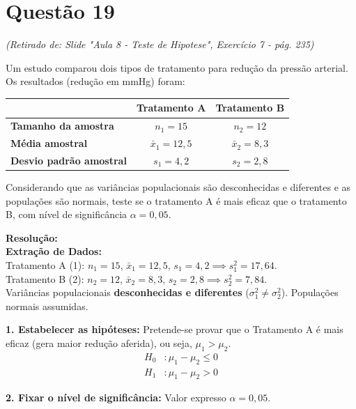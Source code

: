 \documentclass[12pt, a4paper]{article}
\begin{document}
\section*{Questão 19}
\textit{(Retirado de: Slide "Aula 8 - Teste de Hipotese", Exercício 7 - pág. 235)}

Um estudo comparou dois tipos de tratamento para redução da pressão arterial. Os resultados (redução em mmHg) foram:

\begin{table}[h]
\centering
\begin{tabular}{lcc}
\toprule
\textbf{} & \textbf{Tratamento A} & \textbf{Tratamento B} \\ \midrule
\textbf{Tamanho da amostra} & $n_1 = 15$ & $n_2 = 12$ \\
\textbf{Média amostral} & $\bar{x}_1 = 12{,}5$ & $\bar{x}_2 = 8{,}3$ \\
\textbf{Desvio padrão amostral} & $s_1 = 4{,}2$ & $s_2 = 2{,}8$ \\ \bottomrule
\end{tabular}
\end{table}

\medskip\noindent Considerando que as variâncias populacionais são desconhecidas e diferentes e as populações são normais, teste se o tratamento A é mais eficaz que o tratamento B, com nível de significância $\alpha = 0{,}05$.

\vspace{0.3cm}
\noindent\textbf{Resolução:}\\
\textbf{Extração de Dados:} \\
Tratamento A (1): $n_1 = 15$, $\bar{x}_1 = 12{,}5$, $s_1 = 4{,}2 \implies s^2_1 = 17{,}64$. \\
Tratamento B (2): $n_2 = 12$, $\bar{x}_2 = 8{,}3$, $s_2 = 2{,}8 \implies s^2_2 = 7{,}84$. \\
Variâncias populacionais \textbf{desconhecidas e diferentes} ($\sigma_1^2 \neq \sigma_2^2$). Populações normais assumidas.

\medskip\noindent \textbf{1. Estabelecer as hipóteses:}
Pretende-se provar que o Tratamento A é mais eficaz (gera maior redução aferida), ou seja, $\mu_1 > \mu_2$.
\begin{align*}
H_0 &: \mu_1 - \mu_2 \le 0 \\
H_1 &: \mu_1 - \mu_2 > 0
\end{align*}

\noindent \textbf{2. Fixar o nível de significância:}
Valor expresso $\alpha = 0{,}05$.
\end{document}
